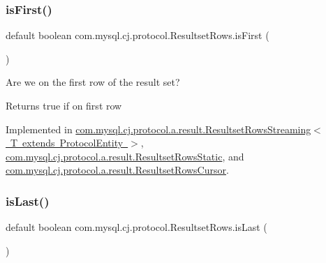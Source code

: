\mbox{\label{interfacecom_1_1mysql_1_1cj_1_1protocol_1_1_resultset_rows_ae7d5b7ca8787eaca7ee5e0ca69ac2818}} 
\subsubsection{\texorpdfstring{is\+First()}{isFirst()}}
{\footnotesize\ttfamily default boolean com.\+mysql.\+cj.\+protocol.\+Resultset\+Rows.\+is\+First (\begin{DoxyParamCaption}{ }\end{DoxyParamCaption})}

Are we on the first row of the result set?

\begin{DoxyReturn}{Returns}
true if on first row 
\end{DoxyReturn}


Implemented in \mbox{\hyperlink{classcom_1_1mysql_1_1cj_1_1protocol_1_1a_1_1result_1_1_resultset_rows_streaming_a723004a61b6ca61f2da79c7876c62502}{com.\+mysql.\+cj.\+protocol.\+a.\+result.\+Resultset\+Rows\+Streaming$<$ T extends Protocol\+Entity $>$}}, \mbox{\hyperlink{classcom_1_1mysql_1_1cj_1_1protocol_1_1a_1_1result_1_1_resultset_rows_static_ad16947839519d3bf8c5bc679f6920b5c}{com.\+mysql.\+cj.\+protocol.\+a.\+result.\+Resultset\+Rows\+Static}}, and \mbox{\hyperlink{classcom_1_1mysql_1_1cj_1_1protocol_1_1a_1_1result_1_1_resultset_rows_cursor_a8d0ae8e04f7731f461437563ea13c6b9}{com.\+mysql.\+cj.\+protocol.\+a.\+result.\+Resultset\+Rows\+Cursor}}.

\mbox{\label{interfacecom_1_1mysql_1_1cj_1_1protocol_1_1_resultset_rows_ae52ab20020adafaf87c2f45bae82980d}} 
\subsubsection{\texorpdfstring{is\+Last()}{isLast()}}
{\footnotesize\ttfamily default boolean com.\+mysql.\+cj.\+protocol.\+Resultset\+Rows.\+is\+Last (\begin{DoxyParamCaption}{ }\end{DoxyParamCaption})}

